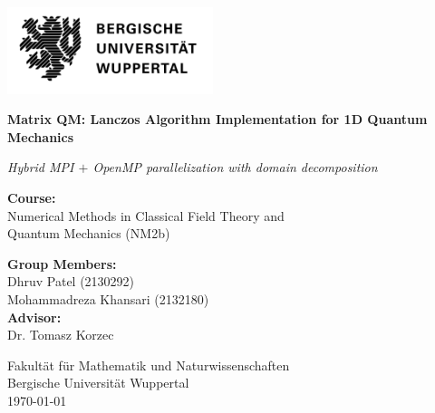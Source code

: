 \documentclass[12pt,a4paper]{report}
\begin{document}
\begin{titlepage}
  \centering
  \includegraphics[width=0.45\textwidth]{Unilogo_schwarz_T3.png}\par\vspace{1.8cm}
  
  {\LARGE \textrm{\textbf{Matrix QM: Lanczos Algorithm Implementation for 1D Quantum Mechanics}}\par}
  \vspace{0.3cm}
  {\large \textrm{\textit{Hybrid MPI $+$ OpenMP parallelization with domain decomposition}}\par}
  \vspace{1.5cm}

  \textbf{\normalsize Course:}\\[0.3em]
  \textrm{\normalsize Numerical Methods in Classical Field Theory and\\Quantum Mechanics (NM2b)\\[1.8em]}
  
  \textbf{\normalsize Group Members:}\\[0.3em]
  \textrm{\normalsize Dhruv Patel (2130292)\\}
  \textrm{\normalsize Mohammadreza Khansari (2132180)\\[1.8em]}
  \textbf{\normalsize Advisor:}\\[0.3em]
  \textrm{\normalsize Dr. Tomasz Korzec\\[1.8em]}

  \textrm{\normalsize Fakultät für Mathematik und Naturwissenschaften\\[0.3em]}
  \textrm{\normalsize Bergische Universität Wuppertal}\\[1.8em]

  {\normalsize \textrm{\today}}\par

\end{titlepage}
\end{document}

